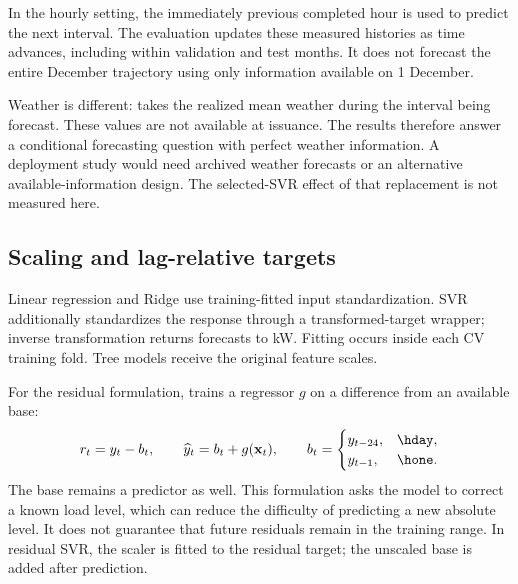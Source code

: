 In the hourly setting, the immediately previous completed hour is used to predict the next interval. The evaluation updates these measured histories as time advances, including within validation and test months. It does not forecast the entire December trajectory using only information available on 1 December.

Weather is different:  takes the realized mean weather during the interval being forecast. These values are not available at issuance. The results therefore answer a conditional forecasting question with perfect weather information. A deployment study would need archived weather forecasts or an alternative available-information design. The selected-SVR effect of that replacement is not measured here.

\subsection{Scaling and lag-relative targets}
Linear regression and Ridge use training-fitted input standardization. SVR additionally standardizes the response through a transformed-target wrapper; inverse transformation returns forecasts to kW. Fitting occurs inside each CV training fold. Tree models receive the original feature scales.

For the residual formulation,  trains a regressor $g$ on a difference from an available base:
\begin{equation}
r_t=y_t-b_t,\qquad \widehat y_t=b_t+g(\mathbf{x}_t),\qquad
b_t=\begin{cases}y_{t-24},&\hday,\\y_{t-1},&\hone.\end{cases}
\label{eq:delta}
\end{equation}
The base remains a predictor as well. This formulation asks the model to correct a known load level, which can reduce the difficulty of predicting a new absolute level. It does not guarantee that future residuals remain in the training range. In residual SVR, the scaler is fitted to the residual target; the unscaled base is added after prediction.
